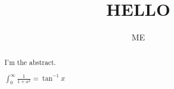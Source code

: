 \documentclass{ximera}
\title{HELLO}
\author{ME}
\begin{document}
\begin{abstract}

I'm the abstract.

$\int_0^{\infty}\frac{1}{1+x^2}=\tan^{-1}x$

\end{abstract}
\maketitle

\end{document}
